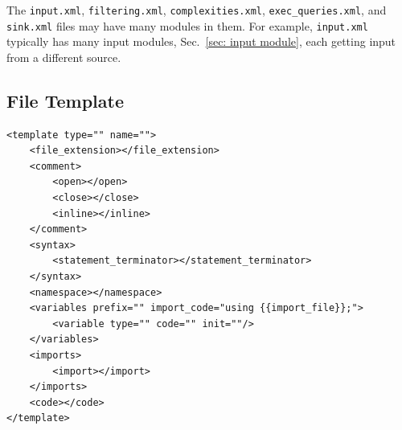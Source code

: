 \documentclass[12pt]{article}
\begin{document}
The \verb|input.xml|, \verb|filtering.xml|, \verb|complexities.xml|,
\verb|exec_queries.xml|, and \verb|sink.xml| files may have many
modules in them.  For example, \verb|input.xml| typically has
many input modules, Sec.~\ref{sec: input module}, each getting 
input from a different source.

\subsection{File Template}
\label{sec: file template}

\begin{verbatim}
<template type="" name="">
    <file_extension></file_extension>
    <comment>
        <open></open>
        <close></close>
        <inline></inline>
    </comment>
    <syntax>
        <statement_terminator></statement_terminator>
    </syntax>
    <namespace></namespace>
    <variables prefix="" import_code="using {{import_file}};">
        <variable type="" code="" init=""/>
    </variables>
    <imports>
        <import></import>
    </imports>
    <code></code>
</template>
\end{verbatim}
\end{document}
